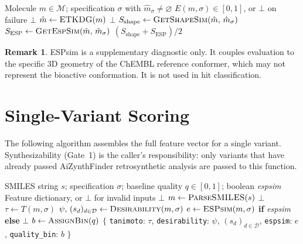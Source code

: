 \documentclass[11pt, a4paper]{article}
\theoremstyle{definition}
\newtheorem{remark}{Remark}[section]
\newcommand{\1}[1]{\mathbf{1}\!\left[#1\right]}   %
\newcommand{\Desc}{\mathcal{D}}                     %
\begin{document}
\begin{algorithm}[H]
\caption{\textsc{ESPsim}$(m, \sigma)$ --- 3D shape and electrostatic similarity}
\label{alg:espsim}
\begin{algorithmic}[1]
\Require Molecule $m \in \mathcal{M}$; specification $\sigma$ with
         $\hat{m}_\sigma \neq \varnothing$
\Ensure  $E(m, \sigma) \in [0, 1]$, or $\bot$ on failure
  \Return $\bot$
\EndIf
\State $\hat{m} \leftarrow \textsc{ETKDG}(m)$
 \Return $\bot$ \EndIf
\State $S_\text{shape} \leftarrow \textsc{GetShapeSim}(\hat{m},\, \hat{m}_\sigma)$
\State $S_\text{ESP}   \leftarrow \textsc{GetEspSim}(\hat{m},\, \hat{m}_\sigma)$
\Return $(S_\text{shape} + S_\text{ESP}) / 2$
\end{algorithmic}
\end{algorithm}

\begin{remark}
ESPsim is a supplementary diagnostic only.
It couples evaluation to the specific 3D geometry of the ChEMBL reference
conformer, which may not represent the bioactive conformation.
It is not used in hit classification.
\end{remark}


\section{Single-Variant Scoring}
\label{sec:score-variant}

The following algorithm assembles the full feature vector for a single
variant.
Synthesizability (Gate~1) is the caller's responsibility: only variants that
have already passed AiZynthFinder retrosynthetic analysis are passed to
this function.

\begin{algorithm}[H]
\caption{\textsc{ScoreVariant}$(s, \sigma, q, \textit{espsim})$}
\label{alg:score-variant}
\begin{algorithmic}[1]
\Require SMILES string $s$; specification $\sigma$;
         baseline quality $q \in [0,1]$;
         boolean \textit{espsim}
\Ensure  Feature dictionary, or $\bot$ for invalid inputs
  \Return $\bot$
\EndIf
\State $m \leftarrow \textsc{ParseSMILES}(s)$
 \Return $\bot$ \EndIf
\State $\tau \leftarrow T(m, \sigma)$
\State $\psi,\, (s_d)_{d\in\Desc} \leftarrow \textsc{Desirability}(m, \sigma)$
\State $e \leftarrow \textsc{ESPsim}(m, \sigma)$ \textbf{if} \textit{espsim}
       \textbf{else} $\bot$
\State $b \leftarrow \textsc{AssignBin}(q)$
\Return $\bigl\{$
  \texttt{tanimoto}: $\tau$,\;
  \texttt{desirability}: $\psi$,\;
  $(s_d)_{d\in\Desc}$,\;
  \texttt{espsim}: $e$,\;
  \texttt{quality\_bin}: $b$
$\bigr\}$
\end{algorithmic}
\end{algorithm}
\end{document}
